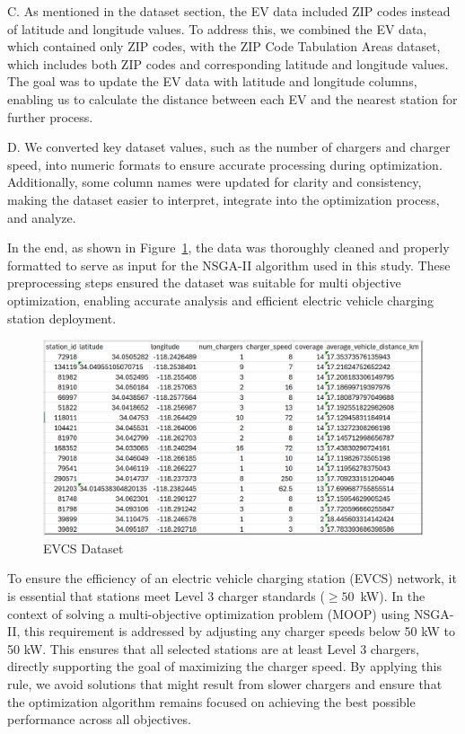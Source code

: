 C. As mentioned in the dataset section, the EV data included ZIP codes instead of latitude and longitude values. To address this, we combined the EV data, which contained only ZIP codes, with the ZIP Code Tabulation Areas dataset, which includes both ZIP codes and corresponding latitude and longitude values. The goal was to update the EV data with latitude and longitude columns, enabling us to calculate the distance between each EV and the nearest station for further process.

D. We converted key dataset values, such as the number of chargers and charger speed, into numeric formats to ensure accurate processing during optimization. Additionally, some column names were updated for clarity and consistency, making the dataset easier to interpret, integrate into the optimization process, and analyze.


In the end, as shown in Figure~\ref{fig:EVCS Dataset}, the data was thoroughly cleaned and properly formatted to serve as input for the NSGA-II algorithm used in this study. These preprocessing steps ensured the dataset was suitable for multi objective optimization, enabling accurate analysis and efficient electric vehicle charging station deployment. 
\newline
\begin{figure}[h]
    \centering
    \includegraphics[width=\textwidth]{../Figures/evcs_dataset.PNG}
    \caption{EVCS Dataset}
    \label{fig:EVCS Dataset}
\end{figure}
\newline


To ensure the efficiency of an electric vehicle charging station (EVCS) network, it is essential that stations meet Level 3 charger standards (\(\geq 50\)~kW). In the context of solving a multi-objective optimization problem (MOOP) using NSGA-II, this requirement is addressed by adjusting any charger speeds below 50 kW to 50 kW. This ensures that all selected stations are at least Level 3 chargers, directly supporting the goal of maximizing the charger speed. By applying this rule, we avoid solutions that might result from slower chargers and ensure that the optimization algorithm remains focused on achieving the best possible performance across all objectives.



